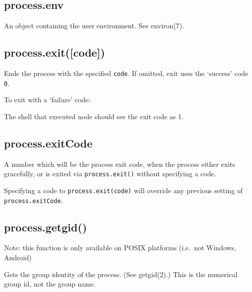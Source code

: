 \subsection{process.env}\label{process.env}

An object containing the user environment. See environ(7).

\subsection{process.exit({[}code{]})}\label{process.exitcode}

Ends the process with the specified \texttt{code}. If omitted, exit uses
the `success' code \texttt{0}.

To exit with a `failure' code:

\begin{Shaded}
\begin{Highlighting}[]
\NormalTok{(}\NormalTok{);}
\end{Highlighting}
\end{Shaded}

The shell that executed node should see the exit code as 1.

\subsection{process.exitCode}\label{process.exitcode-1}

A number which will be the process exit code, when the process either
exits gracefully, or is exited via \texttt{process.exit()} without
specifying a code.

Specifying a code to \texttt{process.exit(code)} will override any
previous setting of \texttt{process.exitCode}.

\subsection{process.getgid()}\label{process.getgid}

Note: this function is only available on POSIX platforms (i.e.~not
Windows, Android)

Gets the group identity of the process. (See getgid(2).) This is the
numerical group id, not the group name.

\begin{Shaded}
\begin{Highlighting}[]
 \NormalTok{(}\NormalTok{) \{}
  \NormalTok{(} \NormalTok{+ }\NormalTok{());}
\NormalTok{\}}
\end{Highlighting}
\end{Shaded}

